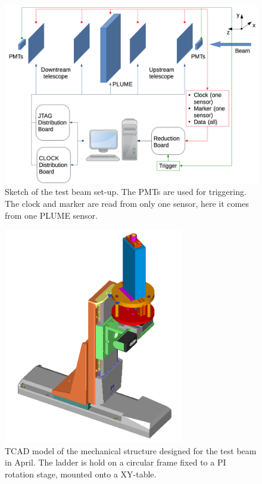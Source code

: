     \begin{figure}
      \centering
      \includegraphics[width = \textwidth]{Pictures/X0/testBeamAcquisition.png}
      \caption{Sketch of the test beam set-up. The PMTs are used for triggering. The clock and marker are read from only one sensor, here it comes from one PLUME sensor.}
      \label{fig:testBeamAcq}
    \end{figure}


    \begin{figure}
      \centering
      \includegraphics[width = 0.7\textwidth]{Pictures/X0/Frame/Testbeam1.PNG}
      \caption{TCAD model of the mechanical structure designed for the test beam in April. The ladder is hold on a circular frame fixed to a PI rotation stage, mounted onto a XY-table.}
      \label{fig:mechanics}
    \end{figure}

